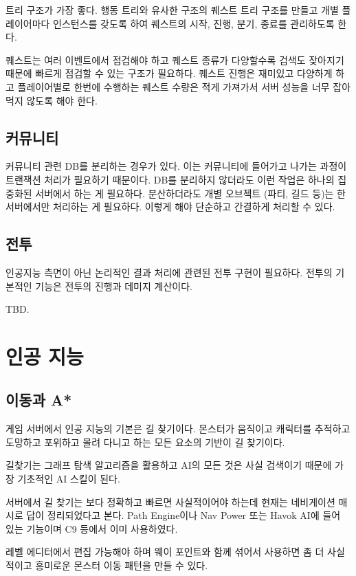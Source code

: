 \documentclass[chapter,kosection, 10.5pt, romanfixed, a4paper]{oblivoir}
\begin{document}
트리 구조가 가장 좋다. 행동 트리와 유사한 구조의 퀘스트 트리 구조를 만들고 개별 플레이어마다 인스턴스를 
갖도록 하여 퀘스트의 시작, 진행, 분기, 종료를 관리하도록 한다. 

퀘스트는 여러 이벤트에서 점검해야 하고 퀘스트 종류가 다양할수록 검색도 잦아지기 때문에 빠르게 점검할 수 
있는 구조가 필요하다. 퀘스트 진행은 재미있고 다양하게 하고 플레이어별로 한번에 수행하는 퀘스트 수량은
적게 가져가서 서버 성능을 너무 잡아먹지 않도록 해야 한다. 

\subsection{커뮤니티}

커뮤니티 관련 DB를 분리하는 경우가 있다. 이는 커뮤니티에 들어가고 나가는 과정이 트랜잭션 처리가 필요하기 때문이다. 
DB를 분리하지 않더라도 이런 작업은 하나의 집중화된 서버에서 하는 게 필요하다. 분산하더라도 개별 오브젝트 (파티, 길드 등)는
한 서버에서만 처리하는 게 필요하다. 이렇게 해야 단순하고 간결하게 처리할 수 있다. 

\subsection{전투}

인공지능 측면이 아닌 논리적인 결과 처리에 관련된 전투 구현이 필요하다. 전투의 기본적인 기능은
전투의 진행과 데미지 계산이다. 

TBD. 


\section{인공 지능}

\subsection{이동과 A*}

게임 서버에서 인공 지능의 기본은 길 찾기이다. 몬스터가 움직이고 캐릭터를 추적하고 
도망하고 포위하고 몰려 다니고 하는 모든 요소의 기반이 길 찾기이다. 

길찾기는 그래프 탐색 알고리즘을 활용하고 AI의 모든 것은 사실 검색이기 때문에
가장 기초적인 AI 스킬이 된다. 

서버에서 길 찾기는 보다 정확하고 빠르면 사실적이어야 하는데 현재는 네비게이션 매시로 
답이 정리되었다고 본다. Path Engine이나 Nav Power 또는 Havok AI에 들어 있는 기능이며 
C9 등에서 이미 사용하였다. 

레벨 에디터에서 편집 가능해야 하며 웨이 포인트와 함께 섞어서 사용하면 좀 더 사실적이고
흥미로운 몬스터 이동 패턴을 만들 수 있다. 
\end{document}
